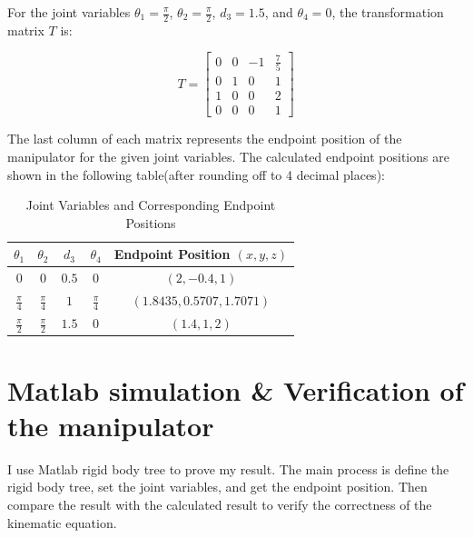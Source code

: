 \documentclass{article}
\begin{document}
For the joint variables \(\theta_1 = \frac{\pi}{2}\), \(\theta_2 = \frac{\pi}{2}\), \(d_3 = 1.5\), and \(\theta_4 = 0\),
the transformation matrix \( T \) is:

\[
T = \begin{bmatrix}
0 & 0 & -1 & \frac{7}{5} \\
0 & 1 & 0 & 1 \\
1 & 0 & 0 & 2 \\
0 & 0 & 0 & 1
\end{bmatrix}
\]

The last column of each matrix represents the endpoint position of the manipulator for the given 
joint variables. 
The calculated endpoint positions are shown in the following table(after rounding off to 4 decimal places):

\begin{table}[h!]
  \centering
  \begin{tabular}{|c|c|c|c|c|}
  \hline
  $\theta_1$ & $\theta_2$ & $d_3$ & $\theta_4$ & Endpoint Position $(x, y, z)$ \\
  \hline
  $0$ & $0$ & $0.5$ & 0 & $(2, -0.4, 1)$ \\
  $\frac{\pi}{4}$ & $\frac{\pi}{4}$ & $1$ & $\frac{\pi}{4}$ & $(1.8435, 0.5707, 1.7071)$ \\
  $\frac{\pi}{2}$ & $\frac{\pi}{2}$ & $1.5$ & $0$ & $(1.4, 1, 2)$ \\
  \hline
  \end{tabular}
  \caption{Joint Variables and Corresponding Endpoint Positions}
  \label{tab:endpoint_positions}
\end{table}

\section*{Matlab simulation \& Verification of the manipulator}

I use Matlab rigid body tree to prove my result. The main process is define the rigid body tree, 
set the joint variables, and get the endpoint position. 
Then compare the result with the calculated result to verify the correctness of the kinematic equation. 
\end{document}
